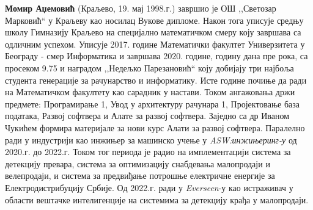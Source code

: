 \documentclass[11pt,oneside]{memoir}
\begin{document}



\begin{biografija}
  \textbf{Момир Аџемовић} (Краљево, 19. мај 1998.г.) завршио је ОШ ,,Светозар Марковић`` у Краљеву као носилац Вукове дипломе. Након
  тога уписује средњу школу Гимназију Краљево на специјално математичком смеру коју завршава са одличним успехом. Уписује 2017.
  године Математички факултет Универзитета у Београду - смер Информатика и завршава 2020. године, годину дана пре рока, са просеком
  9.75 и наградом ,,Недељко Парезановић`` коју добијају три најбоља студента генерације за рачунарство и информатику. Исте године
  почиње да ради на Математичком факултету као сарадник у настави. Током ангажовања држи предмете: Програмирање 1, Увод у архитектуру
  рачунара 1, Пројектовање база података, Развој софтвера и Алате за развој софтвера. Заједно са др Иваном Чукићем формира
  материјале за нови курс Алати за развој софтвера. Паралелно ради у индустрији као инжињер за машинско учење 
  у \textit{ASW:инжињеринг-у} од 2020.г. до 2022.г. Током тог периода је радио на имплементацији система за детекцију превара,
  система за оптимизацију снабдевања малопродаји и велепродаји, и система за предвиђање потрошње електричне енергије за Електродистрибуцију
  Србије. Од 2022.г. ради у \textit{Everseen}-у као истраживач у области вештачке интелигенције на системима за детекцију крађа
  у малопродаји.
  \end{biografija}
\end{document}
